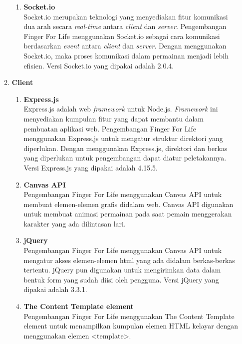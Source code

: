 \begin{enumerate}
\begin{enumerate}
\begin{enumerate}
			\item \textbf{Socket.io} \\
			Socket.io merupakan teknologi yang menyediakan fitur komunikasi dua arah secara \textit{real-time} antara \textit{client} dan \textit{server}. Pengembangan Finger For Life menggunakan Socket.io sebagai cara komunikasi berdasarkan \textit{event} antara \textit{client} dan \textit{server}. Dengan menggunakan Socket.io, maka proses komunikasi dalam permainan menjadi lebih efisien. Versi Socket.io yang dipakai adalah 2.0.4.
			 
		\end{enumerate}
		
		\item \textbf{Client}
		\begin{enumerate}
			\item \textbf{Express.js} \\
			Express.js adalah web \textit{framework} untuk Node.js. \textit{Framework} ini menyediakan kumpulan fitur yang dapat membantu dalam pembuatan aplikasi web. Pengembangan Finger For Life menggunakan Express.js untuk mengatur struktur direktori yang diperlukan. Dengan menggunakan Express.js, direktori dan berkas yang diperlukan untuk pengembangan dapat diatur peletakannya. Versi Express.js yang dipakai adalah 4.15.5.
			
			\item \textbf{Canvas API} \\
			Pengembangan Finger For Life menggunakan Canvas API untuk membuat elemen-elemen grafis didalam web. Canvas API digunakan untuk membuat animasi permainan pada saat pemain menggerakan karakter yang ada dilintasan lari.
			
			\item \textbf{jQuery} \\
			Pengembangan Finger For Life menggunakan Canvas API untuk mengatur akses elemen-elemen html yang ada didalam berkas-berkas tertentu. jQuery pun digunakan untuk mengirimkan data dalam bentuk form yang sudah diisi oleh pengguna. Versi jQuery yang dipakai adalah 3.3.1.
			
			\item \textbf{The Content Template element} \\
			Pengembangan Finger For Life menggunakan The Content Template element untuk menampilkan kumpulan elemen HTML kelayar dengan menggunakan elemen <template>. 
			
		\end{enumerate}
	\end{enumerate}
	
\end{enumerate}

